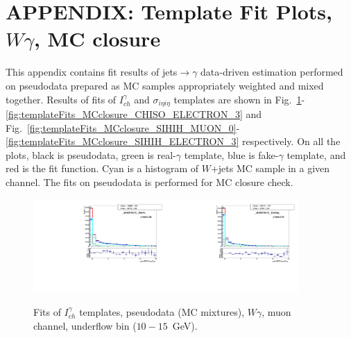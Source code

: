 \section{APPENDIX: Template Fit Plots, $W\gamma$, MC closure}
\label{sec:TemplateFitPlotsMCclosure}

This appendix contains fit results of jets$\rightarrow \gamma$ data-driven estimation performed on pseudodata prepared as MC samples appropriately weighted and mixed together. Results of fits of $I_{ch}^{\gamma}$ and $\sigma_{i\eta i\eta}$ templates are shown in Fig.~\ref{fig:templateFits_MCclosure_CHISO_MUON_0}-\ref{fig:templateFits_MCclosure_CHISO_ELECTRON_3} and Fig.~\ref{fig:templateFits_MCclosure_SIHIH_MUON_0}-\ref{fig:templateFits_MCclosure_SIHIH_ELECTRON_3} respectively. On all the plots, black is pseudodata, green is real-$\gamma$ template, blue is fake-$\gamma$ template, and red is the fit function. Cyan is a histogram of $W$+jets MC sample in a given channel. The fits on pseudodata is performed for MC closure check. 

  

\begin{figure}[htb]
  \begin{center}
   \includegraphics[width=0.45\textwidth]{../figs/figs_v11/MUON_WGamma/TemplateFits/c_TEMPL_CHISO_UNblind__phoEt10to15__Barrel__RooFit_MCclosure.pdf}\includegraphics[width=0.45\textwidth]{../figs/figs_v11/MUON_WGamma/TemplateFits/c_TEMPL_CHISO_UNblind__phoEt10to15__Endcap__RooFit_MCclosure.pdf}\\
  \label{fig:templateFits_MCclosure_CHISO_MUON_0}
  \caption{Fits of $I_{ch}^{\gamma}$ templates, pseudodata (MC mixtures), $W\gamma$, muon channel, underflow bin ($10-15$~GeV).}
  \end{center}
\end{figure}


